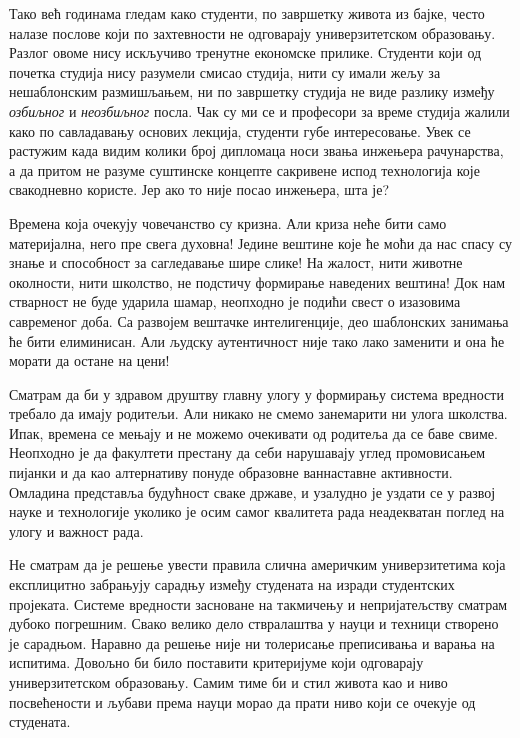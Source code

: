 \documentclass[b5paper]{article}
\begin{document}
Тако већ годинама гледам како студенти, по завршетку живота из бајке, често налазе послове који по захтевности не одговарају универзитетском образовању. Разлог овоме нису искључиво тренутне економске прилике. Студенти који од почетка студија нису разумели смисао студија, нити су имали жељу за нешаблонским размишљањем, ни по завршетку студија не виде разлику између \textit{озбиљног} и \textit{неозбиљног} посла. Чак су ми се и професори за време студија жалили како по савладавању основих лекција, студенти губе интересовање. Увек се растужим када видим колики број дипломаца носи звања инжењера рачунарства, а да притом не разуме суштинске концепте сакривене испод технологија које свакодневно користе. Јер ако то није посао инжењера, шта је?

Времена која очекују човечанство су кризна. Али криза неће бити само материјална, него пре свега духовна! Једине вештине које ће моћи да нас спасу су знање и способност за сагледавање шире слике! На жалост, нити животне околности, нити школство, не подстичу формирање наведених вештина! Док нам стварност не буде ударила шамар, неопходно је подићи свест о изазовима савременог доба. Са развојем вештачке интелигенције, део шаблонских занимања ће бити елиминисан. Али људску аутентичност није тако лако заменити и она ће морати да остане на цени!

Сматрам да би у здравом друштву главну улогу у формирању система вредности требало да имају родитељи. Али никако не смемо занемарити ни улога школства. Ипак, времена се мењају и не можемо очекивати од родитеља да се баве свиме. Неопходно је да факултети престану да себи нарушавају углед промовисањем пијанки и да као алтернативу понуде образовне ваннаставне активности. Омладина представља будућност сваке државе, и узалудно је уздати се у развој науке и технологије уколико је осим самог квалитета рада неадекватан поглед на улогу и важност рада.

Не сматрам да је решење увести правила слична америчким универзитетима која експлицитно забрањују сарадњу између студената на изради студентских пројеката. Системе вредности засноване на такмичењу и непријатељству сматрам дубоко погрешним. Свако велико дело ствралаштва у науци и техници створено је сарадњом. Наравно да решење није ни толерисање преписивања и варања на испитима. Довољно би било поставити критеријуме који одговарају универзитетском образовању. Самим тиме би и стил живота као и ниво посвећености и љубави према науци морао да прати ниво који се очекује од студената.
\end{document}
